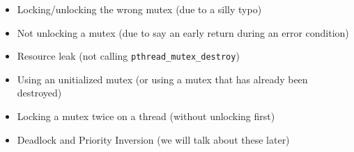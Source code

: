 \begin{itemize}
\itemsep1pt\parskip0pt
\item
  Locking/unlocking the wrong mutex (due to a silly typo)
\item
  Not unlocking a mutex (due to say an early return during an error
  condition)
\item
  Resource leak (not calling \texttt{pthread\_mutex\_destroy})
\item
  Using an unitialized mutex (or using a mutex that has already been
  destroyed)
\item
  Locking a mutex twice on a thread (without unlocking first)
\item
  Deadlock and Priority Inversion (we will talk about these later)
\end{itemize}
